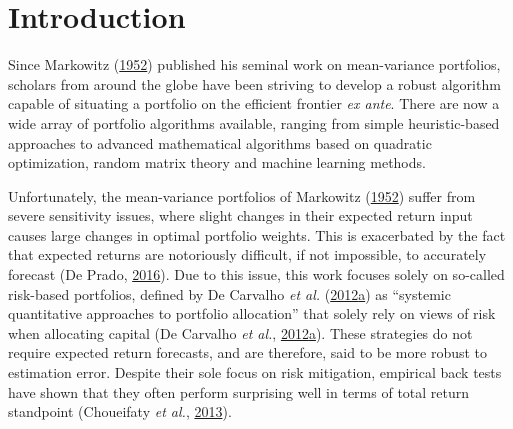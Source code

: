 \documentclass[11pt,preprint, authoryear]{elsarticle}
\numberwithin{equation}{section}
\numberwithin{figure}{section}
\numberwithin{table}{section}
\begin{document}
\pagestyle{fancy}
\chead{}
\rhead{}
\lfoot{}
\lhead{}
\cfoot{}


\headsep 35pt %




\hypertarget{introduction}{%
\section{\texorpdfstring{Introduction
\label{Introduction}}{Introduction }}\label{introduction}}

Since Markowitz (\protect\hyperlink{ref-markowitz}{1952}) published his
seminal work on mean-variance portfolios, scholars from around the globe
have been striving to develop a robust algorithm capable of situating a
portfolio on the efficient frontier \emph{ex ante}. There are now a wide
array of portfolio algorithms available, ranging from simple
heuristic-based approaches to advanced mathematical algorithms based on
quadratic optimization, random matrix theory and machine learning
methods.

Unfortunately, the mean-variance portfolios of Markowitz
(\protect\hyperlink{ref-markowitz}{1952}) suffer from severe sensitivity
issues, where slight changes in their expected return input causes large
changes in optimal portfolio weights. This is exacerbated by the fact
that expected returns are notoriously difficult, if not impossible, to
accurately forecast (De Prado, \protect\hyperlink{ref-lopez}{2016}). Due
to this issue, this work focuses solely on so-called risk-based
portfolios, defined by De Carvalho \emph{et al.}
(\protect\hyperlink{ref-leote}{2012}\protect\hyperlink{ref-leote}{a}) as
``systemic quantitative approaches to portfolio allocation'' that solely
rely on views of risk when allocating capital (De Carvalho \emph{et
al.},
\protect\hyperlink{ref-leote}{2012}\protect\hyperlink{ref-leote}{a}).
These strategies do not require expected return forecasts, and are
therefore, said to be more robust to estimation error. Despite their
sole focus on risk mitigation, empirical back tests have shown that they
often perform surprising well in terms of total return standpoint
(Choueifaty \emph{et al.},
\protect\hyperlink{ref-choueifaty2013}{2013}).
\end{document}
